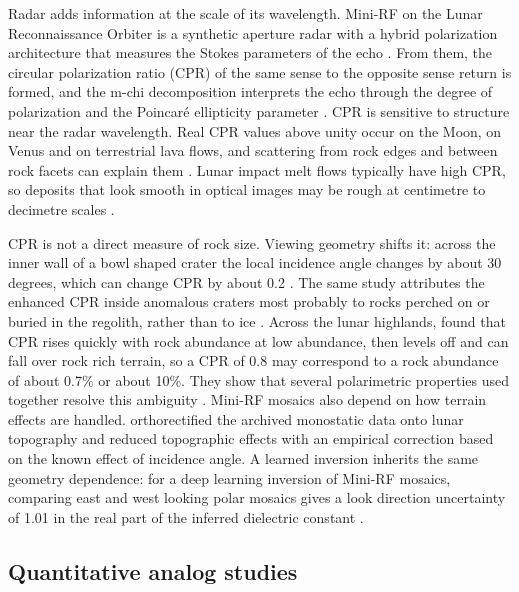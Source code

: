 Radar adds information at the scale of its wavelength. Mini-RF on the Lunar Reconnaissance
Orbiter is a synthetic aperture radar with a hybrid polarization architecture that measures the Stokes parameters of the
echo \citep{nozette2010}. From them, the circular polarization ratio (CPR) of the same sense to
the opposite sense return is formed, and the m-chi decomposition interprets the echo through the degree of polarization and the
Poincar\'e ellipticity parameter \citep{raney2012}. CPR is sensitive to structure near the radar wavelength. Real CPR values above
unity occur on the Moon, on Venus and on terrestrial lava flows, and scattering from rock edges and between rock facets can explain them \citep{campbell2012}. Lunar impact melt flows typically have high
CPR, so deposits that look smooth in optical images may be rough at centimetre to decimetre scales
\citep{carter2012}.

CPR is not a direct measure of rock size. Viewing geometry shifts it: across the inner wall of a
bowl shaped crater the local incidence angle changes by about 30 degrees, which can change CPR by
about 0.2 \citep{fa2013}. The same study attributes the enhanced CPR inside anomalous craters most probably to rocks perched on or buried in the regolith, rather than to ice \citep{fa2013}.
Across the lunar highlands, \citet{riveravalentin2026} found that CPR rises quickly with rock
abundance at low abundance, then levels off and can fall over rock rich terrain, so a CPR of 0.8
may correspond to a rock abundance of about 0.7\% or about 10\%. They show that several
polarimetric properties used together resolve this ambiguity \citep{riveravalentin2026}. Mini-RF
mosaics also depend on how terrain effects are handled. \citet{fassett2024} orthorectified the
archived monostatic data onto lunar topography and reduced topographic effects with an empirical
correction based on the known effect of incidence angle.
A learned inversion inherits the same geometry dependence: for a deep learning inversion of Mini-RF mosaics, comparing east and west looking polar mosaics gives a look direction uncertainty of 1.01 in the real part of the inferred dielectric constant \citep{shukla2024}.

\subsection{Quantitative analog studies}

